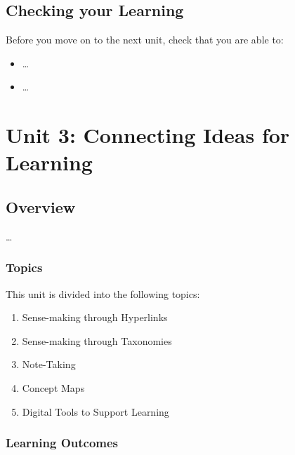 \documentclass[
]{book}
\providecommand{\tightlist}{%
  \setlength{\itemsep}{0pt}\setlength{\parskip}{0pt}}
\theoremstyle{definition}
\theoremstyle{definition}
\theoremstyle{definition}
\theoremstyle{definition}
\theoremstyle{remark}
\begin{document}
\hypertarget{checking-your-learning-1}{%
\section*{Checking your Learning}\label{checking-your-learning-1}}

\begin{progress}
Before you move on to the next unit, check that you are able to:

\begin{itemize}
\tightlist
\item
  \ldots{}
\item
  \ldots{}
\end{itemize}
\end{progress}

\hypertarget{unit-3-connecting-ideas-for-learning}{%
\chapter{Unit 3: Connecting Ideas for Learning}\label{unit-3-connecting-ideas-for-learning}}

\hypertarget{overview-2}{%
\section*{Overview}\label{overview-2}}

\ldots{}

\hypertarget{topics-2}{%
\subsection*{Topics}\label{topics-2}}

This unit is divided into the following topics:

\begin{enumerate}
\def\labelenumi{\arabic{enumi}.}
\tightlist
\item
  Sense-making through Hyperlinks
\item
  Sense-making through Taxonomies
\item
  Note-Taking
\item
  Concept Maps
\item
  Digital Tools to Support Learning
\end{enumerate}

\hypertarget{learning-outcomes-2}{%
\subsection*{Learning Outcomes}\label{learning-outcomes-2}}
\end{document}
